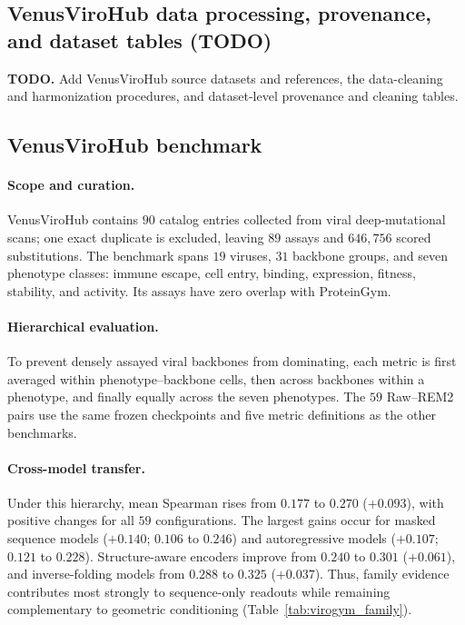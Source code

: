 \documentclass{article} %
\begin{document}
\subsection{VenusViroHub data processing, provenance, and dataset tables (TODO)}
\label{app:virogym_data_processing}

\noindent\textbf{TODO.} Add VenusViroHub source datasets and references, the data-cleaning and harmonization procedures, and dataset-level provenance and cleaning tables.

\subsection{VenusViroHub benchmark}
\label{app:virogym}

\paragraph{Scope and curation.}
VenusViroHub contains $90$ catalog entries collected from viral deep-mutational scans; one exact duplicate is excluded, leaving $89$ assays and $646{,}756$ scored substitutions. The benchmark spans $19$ viruses, $31$ backbone groups, and seven phenotype classes: immune escape, cell entry, binding, expression, fitness, stability, and activity. Its assays have zero overlap with ProteinGym.

\paragraph{Hierarchical evaluation.}
To prevent densely assayed viral backbones from dominating, each metric is first averaged within phenotype--backbone cells, then across backbones within a phenotype, and finally equally across the seven phenotypes. The $59$ Raw--\textsc{REM2} pairs use the same frozen checkpoints and five metric definitions as the other benchmarks.

\paragraph{Cross-model transfer.}
Under this hierarchy, mean Spearman rises from $0.177$ to $0.270$ ($+0.093$), with positive changes for all $59$ configurations. The largest gains occur for masked sequence models ($+0.140$; $0.106$ to $0.246$) and autoregressive models ($+0.107$; $0.121$ to $0.228$). Structure-aware encoders improve from $0.240$ to $0.301$ ($+0.061$), and inverse-folding models from $0.288$ to $0.325$ ($+0.037$). Thus, family evidence contributes most strongly to sequence-only readouts while remaining complementary to geometric conditioning (Table~\ref{tab:virogym_family}).
\end{document}
